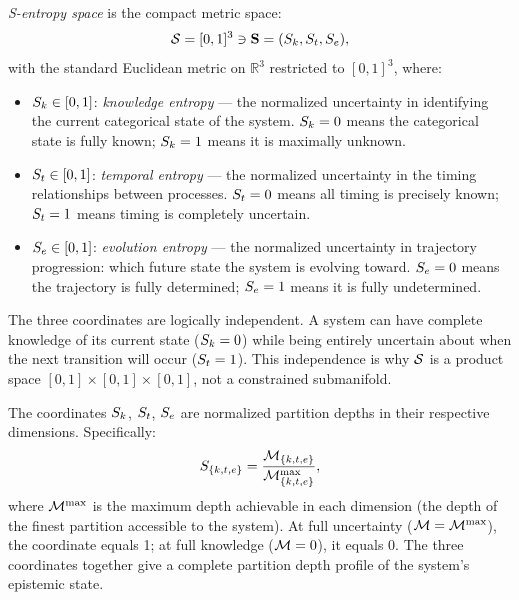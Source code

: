 \begin{definition}
\label{def:sentropy_space}
\emph{S-entropy space} is the compact metric space:
\begin{equation}
  \mathcal{S} = [0,1]^3 \ni \mathbf{S} = (S_k, S_t, S_e),
\end{equation}
with the standard Euclidean metric on $\mathbb{R}^3$ restricted to $[0,1]^3$,
where:
\begin{itemize}
  \item $S_k \in [0,1]$: \emph{knowledge entropy} --- the normalized uncertainty
        in identifying the current categorical state of the system.
        $S_k = 0$ means the categorical state is fully known;
        $S_k = 1$ means it is maximally unknown.
  \item $S_t \in [0,1]$: \emph{temporal entropy} --- the normalized uncertainty
        in the timing relationships between processes.
        $S_t = 0$ means all timing is precisely known;
        $S_t = 1$ means timing is completely uncertain.
  \item $S_e \in [0,1]$: \emph{evolution entropy} --- the normalized uncertainty
        in trajectory progression: which future state the system is evolving toward.
        $S_e = 0$ means the trajectory is fully determined;
        $S_e = 1$ means it is fully undetermined.
\end{itemize}
\end{definition}

\begin{remark}
The three coordinates are logically independent. A system can have complete
knowledge of its current state ($S_k = 0$) while being entirely uncertain about
when the next transition will occur ($S_t = 1$). This independence is why
$\mathcal{S}$ is a product space $[0,1] \times [0,1] \times [0,1]$, not a
constrained submanifold.
\end{remark}

\begin{remark}
The coordinates $S_k$, $S_t$, $S_e$ are normalized partition depths in
their respective dimensions. Specifically:
\begin{equation}
  S_{\{k,t,e\}} = \frac{\mathcal{M}_{\{k,t,e\}}}{\mathcal{M}_{\{k,t,e\}}^{\max}},
\end{equation}
where $\mathcal{M}^{\max}$ is the maximum depth achievable in each dimension
(the depth of the finest partition accessible to the system). At full
uncertainty ($\mathcal{M} = \mathcal{M}^{\max}$), the coordinate equals 1; at full
knowledge ($\mathcal{M} = 0$), it equals 0. The three coordinates together give
a complete partition depth profile of the system's epistemic state.
\end{remark}

